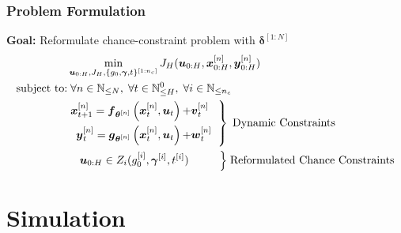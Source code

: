 \documentclass[student, noshadow, itr, english, aspectratio=169]{ITR_LSR_slides}
\begin{document}
\begin{frame}
	\frametitle{Problem Formulation}
\textbf{Goal:} Reformulate chance-constraint problem with $\boldsymbol{\delta}^{[1:N]}$ \\
\begin{align*} 
 &\min\limits_{\boldsymbol{u}_{0:H}, J_H, \{g_0, \boldsymbol{\gamma}, t\}^{[1:n_c]}} J_H(\boldsymbol{u}_{0:H},  \boldsymbol{x}_{0:H}^{[n]},  \boldsymbol{y}_{0:H}^{[n]}) \\
\text{subject to:}&\; \forall n \in \mathbb{N}_{\leq N}, \;  \forall t \in \mathbb{N}_{\leq H}^0, \; \forall i \in \mathbb{N}_{\leq n_c}  \\
&\left. 
\begin {aligned}
\boldsymbol{x}_{t+1}^{[n]} = \boldsymbol{f}_{\boldsymbol{\theta}^{[n]}} \left( \boldsymbol{x}_{t}^{[n]} , \boldsymbol{u}_t \right) + & \boldsymbol{v}_{t}^{[n]}\\
\boldsymbol{y}_{t}^{[n]} = \boldsymbol{g}_{\boldsymbol{\theta}^{[n]}} \left( \boldsymbol{x}_{t}^{[n]}, \boldsymbol{u}_t \right) + & \boldsymbol{w}_{t}^{[n]} 
\end{aligned}
 \;\;  \right\} \; \text{Dynamic Constraints} \\
&\;\;\;\; \boldsymbol{u}_{0:H} \in Z_i(g_0^{[i]}, \boldsymbol{\gamma}^{[i]}, t^{[i]}) \;\;\;\;\;\; \;\;\;\;  \Bigl\} \; \text{Reformulated Chance Constraints}
\end{align*}



\end{frame}

\section{Simulation}
\end{document}

